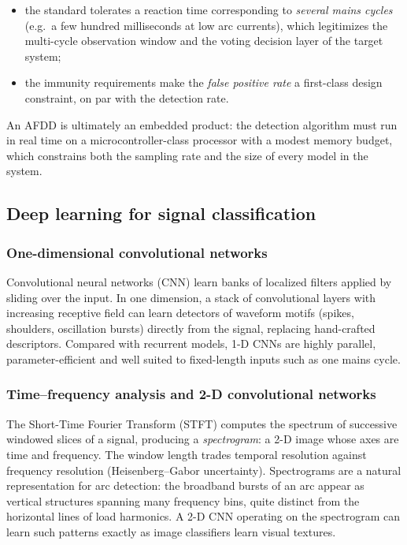\begin{itemize}[itemsep=2pt]
    \item the standard tolerates a reaction time corresponding to \emph{several mains cycles} (e.g.\ a few hundred milliseconds at low arc currents), which legitimizes the multi-cycle observation window and the voting decision layer of the target system;
    \item the immunity requirements make the \emph{false positive rate} a first-class design constraint, on par with the detection rate.
\end{itemize}

An AFDD is ultimately an embedded product: the detection algorithm must run in real time on a microcontroller-class processor with a modest memory budget, which constrains both the sampling rate and the size of every model in the system.

\subsection{Deep learning for signal classification}

\subsubsection{One-dimensional convolutional networks}

Convolutional neural networks (CNN) learn banks of localized filters applied by sliding over the input. In one dimension, a stack of convolutional layers with increasing receptive field can learn detectors of waveform motifs (spikes, shoulders, oscillation bursts) directly from the signal, replacing hand-crafted descriptors. Compared with recurrent models, 1-D CNNs are highly parallel, parameter-efficient and well suited to fixed-length inputs such as one mains cycle.

\subsubsection{Time--frequency analysis and 2-D convolutional networks}

The Short-Time Fourier Transform (STFT) computes the spectrum of successive windowed slices of a signal, producing a \emph{spectrogram}: a 2-D image whose axes are time and frequency. The window length trades temporal resolution against frequency resolution (Heisenberg--Gabor uncertainty). Spectrograms are a natural representation for arc detection: the broadband bursts of an arc appear as vertical structures spanning many frequency bins, quite distinct from the horizontal lines of load harmonics. A 2-D CNN operating on the spectrogram can learn such patterns exactly as image classifiers learn visual textures.

